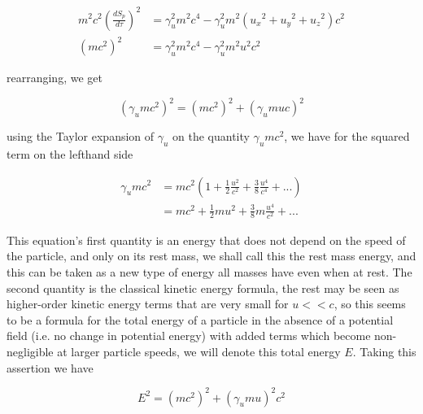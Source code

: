 \begin{equation}
	\label{eq: energy-momentum derivation}
	\begin{aligned}
		m^2 {c}^2 \left(\frac{dS_p}{d\tau}\right)^2 & = \gamma_{u}^2 m^2 c^4-\gamma_{u}^2 m^2 \left( {{u}_{x}}^2 + {{u}_{y}}^2 + {{u}_{z}}^2 \right) {c}^2 \\
		({m}{c}^2)^2                                & = \gamma_{u}^2 m^2 c^4-\gamma_{u}^2 m^2 u^2 {c}^2
	\end{aligned}
\end{equation}

rearranging, we get

\begin{equation}
	\label{eq: total relativistic energy}
	\left( \gamma_{u} m {c}^2 \right)^2 = ({m}{c}^2)^2 + \left( \gamma_{u} {m}{u}{c}\right)^2
\end{equation}

using the Taylor expansion of $\gamma_{u}$ on the quantity $\gamma_{u} {m}{c}^2$, we have for the squared term on the lefthand side

\begin{equation}
	\begin{aligned}
		\gamma_{u} {m}{c}^2 & = {m}{c}^2  \left(1 + \frac{1}{2}\frac{u^2}{{c}^2} + \frac{3}{8}\frac{u^4}{c^4} + ...
		\right)                                                                                                     \\
		                    & = {m}{c}^2 + \frac{1}{2}{m}{u}^2 + \frac{3}{8}m\frac{u^4}{{c}^2} + ...
	\end{aligned}
\end{equation}

This equation's first quantity is an energy that does not depend on the speed of the particle, and only on its rest mass, we shall call this the rest mass energy, and this can be taken as a new type of energy all masses have even when at rest.
The second quantity is the classical kinetic energy formula, the rest may be seen as higher-order kinetic energy terms that are very small for ${u}<<{c}$, so this seems to be a formula for the total energy of a particle in the absence of a potential field (i.e.
no change in potential energy) with added terms which become non-negligible at larger particle speeds, we will denote this total energy ${E}$.
Taking this assertion we have

\begin{equation}
	E^2 = \left( {m}{c}^2 \right)^2 + (\gamma_{u}{m}{u})^2{c}^2
\end{equation}

